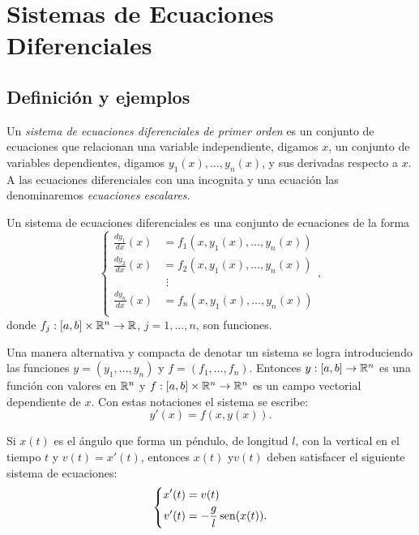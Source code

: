 \section{Sistemas de Ecuaciones Diferenciales}
\subsection{Definición y ejemplos}
Un \emph{sistema de ecuaciones diferenciales de primer orden} es un conjunto  de ecuaciones que relacionan una variable independiente, digamos $x$, un conjunto de variables dependientes, digamos $y_1(x),\ldots,y_n(x)$, y sus derivadas respecto a $x$. A las ecuaciones diferenciales con una incognita y una ecuación las denominaremos \emph{ecuaciones escalares}.

\begin{definicion} Un sistema de ecuaciones diferenciales es una conjunto de ecuaciones de la forma
\begin{equation}\label{eq:sist_ecua}
\left\{
\begin{split}
 \frac{dy_1}{dx}(x)&=f_1(x,y_1(x),\ldots,y_n(x))\\
  \frac{dy_2}{dx}(x)&=f_2(x,y_1(x),\ldots,y_n(x))\\
       &\,\,\vdots                                   \\
 \frac{dy_n}{dx}(x)&=f_n(x,y_1(x),\ldots,y_n(x))\\
\end{split}\right.,
\end{equation}
donde $f_j:[a,b]\times\mathbb{R}^n\to\mathbb{R}$, $j=1,\ldots,n$, son funciones.

Una manera alternativa y compacta de denotar un sistema se logra introduciendo las funciones $y=(y_1,\ldots,y_n)$  y $f=(f_1,\ldots,f_n)$. Entonces $y:[a,b]\to\mathbb{R}^n$ es una función con valores en $\mathbb{R}^n$ y $f:[a,b]\times \mathbb{R}^n\to\mathbb{R}^n$ es un campo vectorial dependiente de $x$. Con estas notaciones el sistema se escribe:
\begin{equation}\label{eq:sist_ecua_comp}
 y'(x)=f(x,y(x)).
\end{equation}

\end{definicion}






\begin{ejemplo} {} Si $x(t)$ es el ángulo que forma un péndulo, de longitud $l$, con la vertical en el tiempo $t$ y $v(t)=x'(t)$, entonces $x(t)$ y$v(t)$ deben satisfacer el siguiente sistema de  ecuaciones:
\begin{equation}\label{eq:sist_pend}
\left\{
\begin{split}
 x'(t)&=v(t)\\
  v'(t)&=-\frac{g}{l}\operatorname{sen}(x(t)).\\
\end{split}\right.
\end{equation}


\end{ejemplo}


